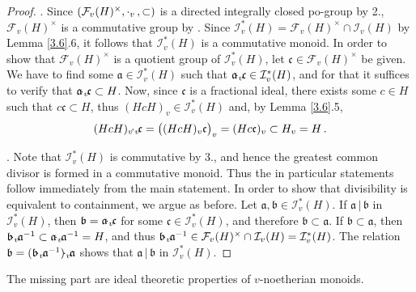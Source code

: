 \documentclass[a4paper]{amsart}
\theoremstyle{definition}
\numberwithin{equation}{section}
\begin{document}
\begin{proof}
. Since $(\mathcal F_v(H)^{\times}, \, {\negthinspace \cdot_v \negthinspace} \ , \subset)$ is a
directed integrally closed po-group by 2., $\mathcal
F_v(H)^{\times}$ is a commutative group by \cite[Theorem
2.3.9]{St10a}. Since $\mathcal I_v^* (H) = \mathcal F_v (H)^{\times}
\cap \mathcal I_v (H)$ by Lemma \ref{3.6}.6, it follows that
$\mathcal I_v^* (H)$ is a commutative monoid. In order to show that
$\mathcal F_v (H)^{\times}$ is a quotient group of $\mathcal I_v^*
(H)$, let $\mathfrak c \in \mathcal F_v (H)^{\times}$ be given. We
have to find some $\mathfrak a \in \mathcal I_v^* (H)$ such that
$\mathfrak a {\negthinspace \cdot_v \negthinspace} \mathfrak c \in \mathcal I_v^* (H)$, and for that
it suffices to verify that $\mathfrak a {\negthinspace \cdot_v \negthinspace} \mathfrak c \subset H$.
Now, since $\mathfrak c$ is a fractional ideal, there exists some $c
\in H$ such that $c\mathfrak c \subset H$, thus $(HcH)_v \in
\mathcal I_v^* (H)$ and, by Lemma \ref{3.6}.5,
\[
(HcH)_v {\negthinspace \cdot_v \negthinspace} \mathfrak c = \big( (HcH)_v \mathfrak c \big)_v =
(Hc\mathfrak c)_v \subset H_v = H \,.
\]

. Note that $\mathcal I_v^* (H)$ is commutative by 3., and hence
the  greatest common divisor is formed in a commutative monoid. Thus
the in particular statements follow immediately from the main
statement. In order to show that divisibility is equivalent to
containment, we argue as before. Let $\mathfrak a, \mathfrak b \in
\mathcal I_v^* (H)$. If $\mathfrak a {\, | \,} \mathfrak b$ in $\mathcal
I^*_v (H)$, then $\mathfrak b = \mathfrak a {\negthinspace \cdot_v \negthinspace} \mathfrak c$ for
some $\mathfrak c \in \mathcal I_v^*(H)$, and therefore $\mathfrak b
\subset \mathfrak a$. If $\mathfrak b \subset \mathfrak a$, then
$\mathfrak b {\negthinspace \cdot_v \negthinspace} \mathfrak a^{-1} \subset \mathfrak a {\negthinspace \cdot_v \negthinspace}
\mathfrak a^{-1} = H$, and thus $\mathfrak b {\negthinspace \cdot_v \negthinspace} \mathfrak a^{-1}
\in  \mathcal F_v (H)^{\times} \cap \mathcal I_v (H) = \mathcal
I^*_v(H)$. The relation $\mathfrak b = (\mathfrak b {\negthinspace \cdot_v \negthinspace} \mathfrak
a^{-1}) {\negthinspace \cdot_v \negthinspace} \mathfrak a$ shows that $\mathfrak a {\, | \,} \mathfrak b$ in
$\mathcal I_v^*(H)$.
\end{proof}

\smallskip
The missing part are ideal theoretic properties of $v$-noetherian monoids.
\end{document}
